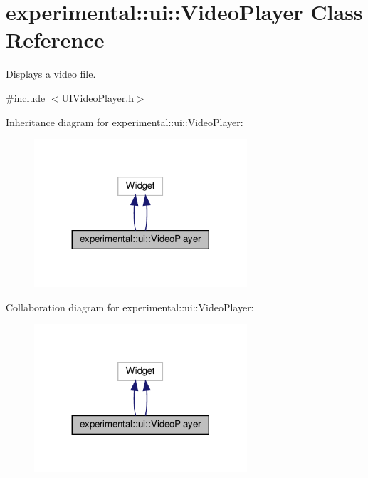 \hypertarget{classexperimental_1_1ui_1_1VideoPlayer}{}\section{experimental\+:\+:ui\+:\+:Video\+Player Class Reference}
\label{classexperimental_1_1ui_1_1VideoPlayer}


Displays a video file.  




{\ttfamily \#include $<$U\+I\+Video\+Player.\+h$>$}



Inheritance diagram for experimental\+:\+:ui\+:\+:Video\+Player\+:
\nopagebreak
\begin{figure}[H]
\begin{center}
\leavevmode
\includegraphics[width=224pt]{classexperimental_1_1ui_1_1VideoPlayer__inherit__graph}
\end{center}
\end{figure}


Collaboration diagram for experimental\+:\+:ui\+:\+:Video\+Player\+:
\nopagebreak
\begin{figure}[H]
\begin{center}
\leavevmode
\includegraphics[width=224pt]{classexperimental_1_1ui_1_1VideoPlayer__coll__graph}
\end{center}
\end{figure}
